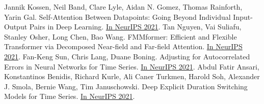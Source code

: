 \documentclass[b5paper,xelatex,ja=standard,10pt]{bxjsarticle}
\begin{document}
\begin{thebibliography}{99}
     Jannik Kossen, Neil Band, Clare Lyle, Aidan N. Gomez, Thomas Rainforth, Yarin Gal. Self-Attention Between Datapoints: Going Beyond Individual Input-Output Pairs in Deep Learning. {\href{https://proceedings.neurips.cc/paper/2021/hash/f1507aba9fc82ffa7cc7373c58f8a613-Abstract.html}{In NeurIPS 2021}}.
     Tan Nguyen, Vai Suliafu, Stanley Osher, Long Chen, Bao Wang. FMMformer: Efficient and Flexible Transformer via Decomposed Near-field and Far-field Attention. {\href{https://proceedings.neurips.cc/paper/2021/hash/f621585df244e9596dc70a39b579efb1-Abstract.html}{In NeurIPS 2021}}.
     Fan-Keng Sun, Chris Lang, Duane Boning. Adjusting for Autocorrelated Errors in Neural Networks for Time Series. {\href{https://proceedings.neurips.cc/paper/2021/hash/f8e6ba1db0f3c4054afec1684ba8fb26-Abstract.html}{In NeurIPS 2021}}.
     Abdul Fatir Ansari, Konstantinos Benidis, Richard Kurle, Ali Caner Turkmen, Harold Soh, Alexander J. Smola, Bernie Wang, Tim Januschowski. Deep Explicit Duration Switching Models for Time Series. {\href{https://proceedings.neurips.cc/paper/2021/hash/fb4c835feb0a65cc39739320d7a51c02-Abstract.html}{In NeurIPS 2021}}.
\end{thebibliography}


\end{document}
